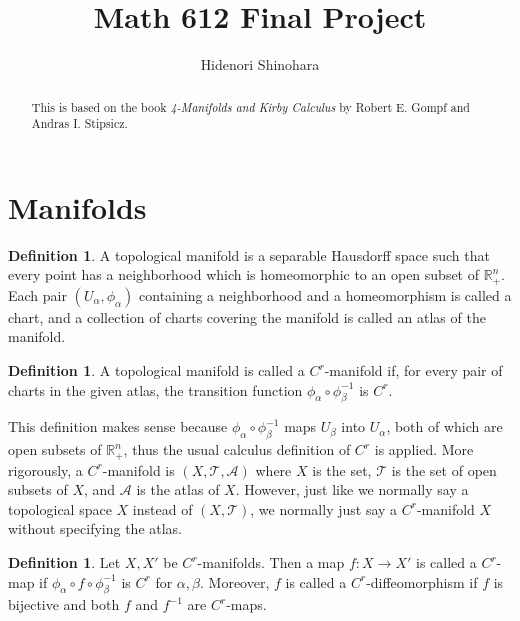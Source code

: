 \documentclass[11pt, psamsfonts]{amsart}
\theoremstyle{definition}
\newtheorem{defn}[thm]{Definition}
\theoremstyle{remark}
\numberwithin{equation}{section}
\begin{document}
\title{Math 612 Final Project}
\author{Hidenori Shinohara}
\maketitle

\begin{abstract}
  This is based on the book \textit{4-Manifolds and Kirby Calculus} by Robert E. Gompf and Andras I. Stipsicz.
\end{abstract}
\tableofcontents

\section{Manifolds}

\begin{defn}
  A topological manifold is a separable Hausdorff space such that every point has a neighborhood which is homeomorphic to an open subset of $\mathbb{R}^n_{+}$.
  Each pair $(U_{\alpha}, \phi_{\alpha})$ containing a neighborhood and a homeomorphism is called a chart, and a collection of charts covering the manifold is called an atlas of the manifold.
\end{defn}

\begin{defn}
  A topological manifold is called a $C^r$-manifold if, for every pair of charts in the given atlas, the transition function $\phi_{\alpha} \circ \phi_{\beta}^{-1}$ is $C^r$.
\end{defn}

This definition makes sense because $\phi_{\alpha} \circ \phi_{\beta}^{-1}$ maps $U_{\beta}$ into $U_{\alpha}$, both of which are open subsets of $\mathbb{R}^n_{+}$, thus the usual calculus definition of $C^r$ is applied.
More rigorously, a $C^r$-manifold is $(X, \mathcal{T}, \mathcal{A})$ where $X$ is the set, $\mathcal{T}$ is the set of open subsets of $X$, and $\mathcal{A}$ is the atlas of $X$.
However, just like we normally say a topological space $X$ instead of $(X, \mathcal{T})$, we normally just say a $C^r$-manifold $X$ without specifying the atlas.

\begin{defn}
  Let $X, X'$ be $C^r$-manifolds.
  Then a map $f: X \rightarrow X'$ is called a $C^r$-map if $\phi_{\alpha} \circ f \circ \phi_{\beta}^{-1}$ is $C^r$ for $\alpha, \beta$.
  Moreover, $f$ is called a $C^r$-diffeomorphism if $f$ is bijective and both $f$ and $f^{-1}$ are $C^r$-maps.
\end{defn}
\end{document}

